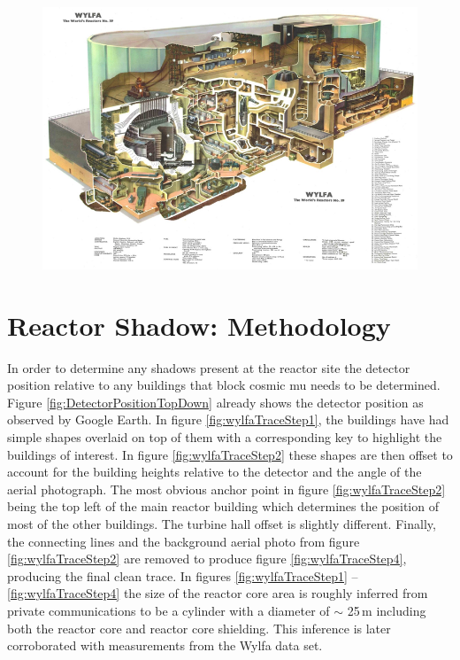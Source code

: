 \begin{figure}[htbp]
 \centering
 \includegraphics[width=0.6\linewidth]{Chapter5/Figs/wylfaRasterNew/wylfaReactorRoughStructure.png}
 \label{fig:wylfaReactorRoughStructure}
\end{figure}

\section{Reactor Shadow: Methodology} \label{sec:ReactorShadowMethodology}
In order to determine any shadows present at the reactor site the detector position relative to any buildings that block cosmic mu needs to be determined. Figure \ref{fig:DetectorPositionTopDown} already shows the detector position as observed by Google Earth. In figure \ref{fig:wylfaTraceStep1}, the buildings have had simple shapes overlaid on top of them with a corresponding key to highlight the buildings of interest. In figure \ref{fig:wylfaTraceStep2} these shapes are then offset to account for the building heights relative to the detector and the angle of the aerial photograph. The most obvious anchor point in figure \ref{fig:wylfaTraceStep2} being the top left of the main reactor building which determines the position of most of the other buildings. The turbine hall offset is slightly different. Finally, the connecting lines and the background aerial photo from figure \ref{fig:wylfaTraceStep2} are removed to produce figure \ref{fig:wylfaTraceStep4}, producing the final clean trace. In figures \ref{fig:wylfaTraceStep1}  -- \ref{fig:wylfaTraceStep4} the size of the reactor core area is roughly inferred from private communications to be a cylinder with a diameter of $\sim$ 25\,m including both the reactor core and reactor core shielding. This inference is later corroborated with measurements from the Wylfa data set. 


